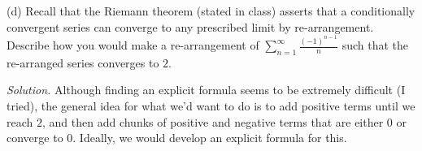 \documentclass{article}
\begin{document}
(d) Recall that the Riemann theorem (stated in class) asserts that a
conditionally convergent series can converge to any prescribed limit by
re-arrangement. Describe how you would make a re-arrangement of
$\sum_{n=1}^\infty \frac{(-1)^{n - 1}}{n}$ such that the re-arranged
series converges to $2$.

\textit{Solution.}
Although finding an explicit formula seems to be extremely difficult (I
tried), the general idea for what we'd want to do is to add positive
terms until we reach $2$, and then add chunks of positive and negative
terms that are either $0$ or converge to $0$. Ideally, we would develop
an explicit formula for this.
\end{document}
